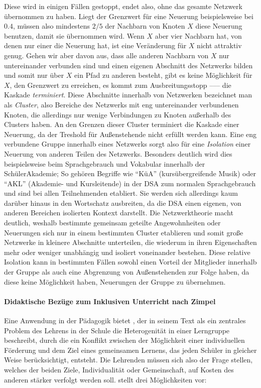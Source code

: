 Diese wird in einigen Fällen gestoppt, endet also, ohne das gesamte Netzwerk übernommen zu haben.
Liegt der Grenzwert für eine Neuerung beispielsweise bei $0.4$, müssen also mindestens $2/5$ der Nachbarn von Knoten $X$ diese Neuerung benutzen, damit sie übernommen wird.
Wenn $X$ aber vier Nachbarn hat, von denen nur einer die Neuerung hat, ist eine Veränderung für $X$ nicht attraktiv genug.
Gehen wir aber davon aus, dass alle anderen Nachbarn von $X$ nur untereinander verbunden sind und einen eigenen Abschnitt des Netzwerks bilden und somit nur über $X$ ein Pfad zu anderen besteht, gibt es keine Möglichkeit für $X$, den Grenzwert zu erreichen, es kommt zum Ausbreitungsstopp ––– die Kaskade \emph{terminiert}.
Diese Abschnitte innerhalb von Netzwerken bezeichnet man als \emph{Cluster}, also Bereiche des Netzwerks mit eng untereinander verbundenen Knoten, die allerdings nur wenige Verbindungen zu Knoten außerhalb des Clusters haben.
An den Grenzen dieser Cluster terminiert die Kaskade einer Neuerung, da der Treshold für Außenstehende nicht erfüllt werden kann.
Eine eng verbundene Gruppe innerhalb eines Netzwerks sorgt also für eine \emph{Isolation} einer Neuerung von anderen Teilen des Netzwerks.
Besonders deutlich wird dies beispielsweise beim Sprachgebrauch und Vokabular innerhalb der SchülerAkademie;
So gehören Begriffe wie ``KüA'' (kursübergreifende Musik) oder ``AKL'' (Akademie- und Kursleitende) in der DSA zum normalen Sprachgebrauch und sind bei allen Teilnehmenden etabliert.
Sie werden sich allerdings kaum darüber hinaus in den Wortschatz ausbreiten, da die DSA einen eigenen, von anderen Bereichen isolierten Kontext darstellt.
Die Netzwerktheorie macht deutlich, weshalb bestimmte gemeinsam geteilte Angewohnheiten oder Neuerungen sich nur in einem bestimmten Cluster etablieren und somit große Netzwerke in kleinere Abschnitte unterteilen, die wiederum in ihren Eigenschaften mehr oder weniger unabhängig und isoliert voneinander bestehen.
Diese relative Isolation kann in bestimmten Fällen sowohl einen Vorteil der Mitglieder innerhalb der Gruppe als auch eine Abgrenzung von Außenstehenden zur Folge haben, da diese keine Möglichkeit haben, Neuerungen der Gruppe zu übernehmen.


\paragraph{Didaktische Bezüge zum Inklusiven Unterricht nach Zimpel}

Eine Anwendung in der Pädagogik bietet \textcite{Zimpel2012}, der in seinem Text als ein zentrales Problem des Lehrens in der Schule die Heterogenität in einer Lerngruppe beschreibt, durch die ein Konflikt zwischen der Möglichkeit einer individuellen Förderung und dem Ziel eines gemeinsamen Lernens, das jeden Schüler in gleicher Weise berücksichtigt, entsteht.
Die Lehrenden müssen sich also der Frage stellen, welches der beiden Ziele, Individualität oder Gemeinschaft, auf Kosten des anderen stärker verfolgt werden soll.
\citeauthor{Zimpel2012} stellt drei Möglichkeiten vor:

